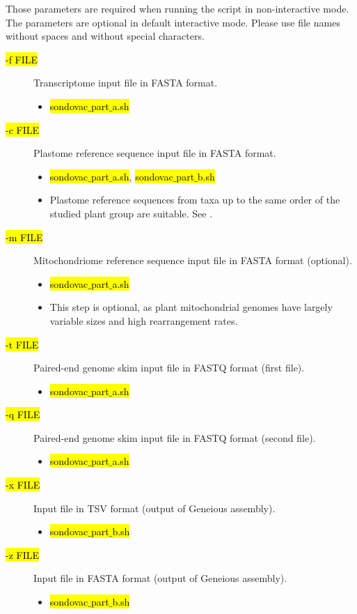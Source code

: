 \documentclass[a4paper, 11pt, twoside]{article}
\renewcommand{\texttt}[1]{\hl{\ttfamily #1}}
\begin{document}
Those parameters are required when running the script in non-interactive mode. The parameters are optional in default interactive mode. Please use file names without spaces and without special characters.

\begin{description}
\item[\texttt{-f FILE}] Transcriptome input file in FASTA format.
  \begin{itemize}
    \item \texttt{sondovac$\_$part$\_$a.sh}
  \end{itemize}
\item[\texttt{-c FILE}] Plastome reference sequence input file in FASTA format.
  \begin{itemize}
    \item \texttt{sondovac$\_$part$\_$a.sh}, \texttt{sondovac$\_$part$\_$b.sh}
    \item Plastome reference sequences from taxa up to the same order of the studied plant group are suitable. See \citet{Straub2012}.
  \end{itemize}
\item[\texttt{-m FILE}] Mitochondriome reference sequence input file in FASTA format (optional).
  \begin{itemize}
    \item \texttt{sondovac$\_$part$\_$a.sh}
    \item This step is optional, as plant mitochondrial genomes have largely variable sizes and high rearrangement rates.
  \end{itemize}
\item[\texttt{-t FILE}] Paired-end genome skim input file in FASTQ format (first file).
  \begin{itemize}
    \item \texttt{sondovac$\_$part$\_$a.sh}
  \end{itemize}
\item[\texttt{-q FILE}] Paired-end genome skim input file in FASTQ format (second file).
  \begin{itemize}
    \item \texttt{sondovac$\_$part$\_$a.sh}
  \end{itemize}
\item[\texttt{-x FILE}] Input file in TSV format (output of Geneious assembly).
  \begin{itemize}
    \item \texttt{sondovac$\_$part$\_$b.sh}
  \end{itemize}
\item[\texttt{-z FILE}] Input file in FASTA format (output of Geneious assembly).
  \begin{itemize}
    \item \texttt{sondovac$\_$part$\_$b.sh}
  \end{itemize}
\end{description}
\end{document}

